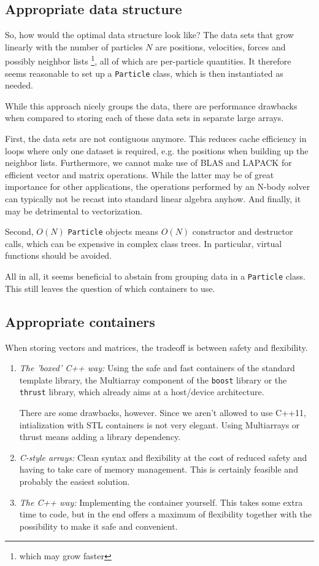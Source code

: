 \documentclass{scrartcl}
\begin{document}
\subsection{Appropriate data structure}
So, how would the optimal data structure look like?
The data sets that grow linearly with the number of particles $N$
are positions, velocities, forces and possibly neighbor lists%
\footnote{which may grow faster}, 
all of which are per-particle quantities.
It therefore seems reasonable to set up a
\verb|Particle| class, which is then instantiated as needed.

While this approach nicely groups the data,
there are performance drawbacks when compared to
storing each of these data sets in separate large arrays.

First, the data sets are not contiguous anymore.
This reduces cache efficiency in loops where only one 
dataset is required, e.g. the positions when building up
the neighbor lists.
Furthermore, we cannot make use of BLAS and LAPACK for efficient
vector and matrix operations. 
While the latter may be of great importance for other applications,
the operations performed by an N-body solver can typically not be recast
into standard linear algebra anyhow.
And finally, it may be detrimental to vectorization.

Second, $O(N)$ \verb|Particle| objects means $O(N)$ constructor
and destructor calls, which can be expensive in complex class trees.
In particular, virtual functions should be avoided.

All in all, it seems beneficial to abstain from 
grouping data in a \verb|Particle| class.
This still leaves the question of which containers to use.

\subsection{Appropriate containers}

When storing vectors and matrices, the tradeoff is between safety and
flexibility.

\begin{enumerate}
    \item \emph{The 'boxed' C++ way:} Using the safe and fast containers
        of the standard template library, 
        the Multiarray component of the \verb|boost| library
        or the \verb|thrust| library, which already aims at a host/device
        architecture.

        There are some drawbacks, however. 
        Since we aren't allowed to use C++11, intialization with STL containers
        is not very elegant. Using Multiarrays or thrust means adding a 
        library dependency.
    \item \emph{C-style arrays:} Clean syntax and flexibility 
        at the cost of reduced safety and having to take care of 
        memory management. This is certainly feasible and probably the 
        easiest solution.
    \item \emph{The C++ way:} Implementing the container yourself.
        This takes some extra time to code, but in the end offers a maximum of
        flexibility together with the possibility to make it safe and convenient.
\end{enumerate}
\end{document}

